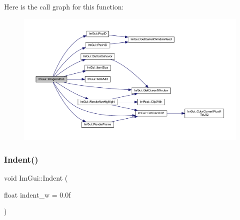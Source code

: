 Here is the call graph for this function\+:
\nopagebreak
\begin{figure}[H]
\begin{center}
\leavevmode
\includegraphics[width=350pt]{namespace_im_gui_ac79ef64e8b9e1db73d8237f6a999da14_cgraph}
\end{center}
\end{figure}
\mbox{\label{namespace_im_gui_a6c7b9f2d60951462eeebad80154a8926}} 
\subsubsection{\texorpdfstring{Indent()}{Indent()}}
{\footnotesize\ttfamily void Im\+Gui\+::\+Indent (\begin{DoxyParamCaption}\item[{float}]{indent\+\_\+w = {\ttfamily 0.0f} }\end{DoxyParamCaption})}

